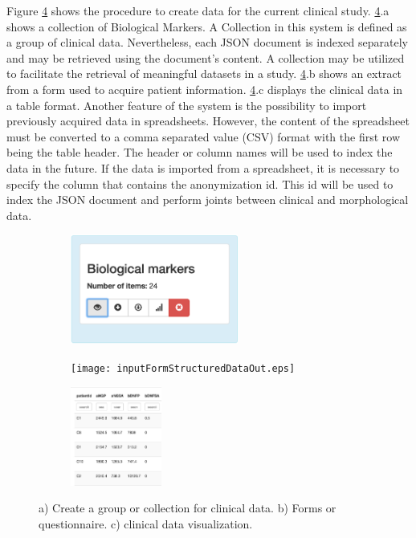 \documentclass[]{spie}  %
\begin{document}
Figure \ref{fig:gnerateClinicalData} shows the procedure to create data for the current clinical study. 
\ref{fig:gnerateClinicalData}.a shows a collection of Biological Markers. A Collection in this system is defined as a group of clinical data. Nevertheless, 
each JSON document is indexed separately and may be retrieved using the document's content. A collection may be utilized to facilitate the retrieval of meaningful datasets in a study. \ref{fig:gnerateClinicalData}.b shows an extract from a form used to acquire patient information. 
\ref{fig:gnerateClinicalData}.c displays the clinical data in a table format. Another feature of the system is the possibility to import previously acquired data in spreadsheets. However, the content of the spreadsheet must be converted to a comma separated value (CSV) format with the first row being the table header. The header or column names will be used to index the data in the future. If the data is imported from a spreadsheet, it is necessary to specify the column that contains the anonymization id. This id will be used to index the JSON document and perform joints between clinical and morphological data.

\begin{figure}
	\centering 
	\begin{subfigure}{0.3\textwidth}
		\includegraphics[width=5.5cm]{CreateCollectionsOut.eps}
		\caption{}
    	\label{fig:CreateCollections}
	\end{subfigure}
	\begin{subfigure}{0.3\textwidth}
		\texttt{[image: inputFormStructuredDataOut.eps]}
		\caption{}
    	\label{fig:inputFormStructuredData}
	\end{subfigure}
	\begin{subfigure}{0.3\textwidth}
		\includegraphics[width=3cm]{ImportDataFromSpreadSheetsOut.eps}
		\caption{}
    	\label{fig:ImportDataFromSpreadSheets}
	\end{subfigure}
	\caption[Import and generate clinical data]{a) Create a group or collection for clinical data. b) Forms or questionnaire. c) clinical data visualization.}
	\label{fig:gnerateClinicalData}
\end{figure} 
\end{document}

